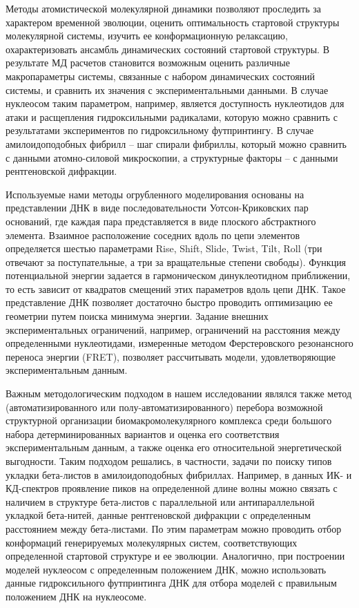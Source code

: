 Методы атомистической молекулярной динамики позволяют проследить за характером временной эволюции, оценить оптимальность стартовой структуры молекулярной системы, изучить ее конформационную релаксацию, охарактеризовать ансамбль динамических состояний стартовой структуры.  В результате МД расчетов становится возможным оценить различные макропараметры системы, связанные с набором динамических состояний системы, и сравнить их значения с экспериментальными данными. В случае нуклеосом таким параметром, например, является доступность нуклеотидов для атаки и расщепления гидроксильными радикалами, которую можно сравнить с результатами экспериментов по гидроксильному футпринтингу. В случае амилоидоподобных фибрилл -- шаг спирали фибриллы, который можно сравнить с данными атомно-силовой микроскопии, а структурные факторы -- с данными рентгеновской дифракции.


Используемые нами методы огрубленного моделирования основаны на представлении ДНК в виде последовательности  Уотсон-Криковских пар оснований, где каждая пара представляется в виде плоского абстрактного элемента. Взаимное расположение соседних вдоль по цепи элементов определяется шестью параметрами Rise, Shift, Slide, Twist, Tilt, Roll (три отвечают за поступательные, а три за вращательные степени свободы). Функция потенциальной энергии задается в гармоническом динуклеотидном приближении, то есть зависит от квадратов смещений этих параметров вдоль цепи ДНК. Такое представление ДНК позволяет достаточно быстро проводить оптимизацию ее геометрии путем поиска минимума энергии. Задание внешних экспериментальных ограничений, например, ограничений на расстояния между определенными нуклеотидами, измеренные методом Ферстеровского резонансного переноса энергии (FRET), позволяет рассчитывать модели, удовлетворяющие экспериментальным данным.

Важным методологическим подходом в нашем исследовании являлся также метод (автоматизированного или полу-автоматизированного) перебора возможной структурной организации биомакромолекулярного комплекса среди большого набора детерминированных вариантов и оценка его соответствия экспериментальным данным, а также оценка его относительной энергетической выгодности. Таким подходом решались, в частности, задачи по поиску типов укладки бета-листов в амилоидоподобных фибриллах. Например, в данных ИК- и КД-спектров проявление пиков на определенной длине волны можно связать с наличием в структуре бета-листов с параллельной или антипараллельной укладкой бета-нитей, данные рентгеновской дифракции с определенным расстоянием между бета-листами. По этим параметрам можно проводить отбор конформаций генерируемых молекулярных систем, соответствующих определенной стартовой структуре и ее эволюции. Аналогично, при построении моделей нуклеосом с определенным положением ДНК, можно использовать данные гидроксильного футпринтинга ДНК для отбора моделей с правильным положением ДНК на нуклеосоме.





